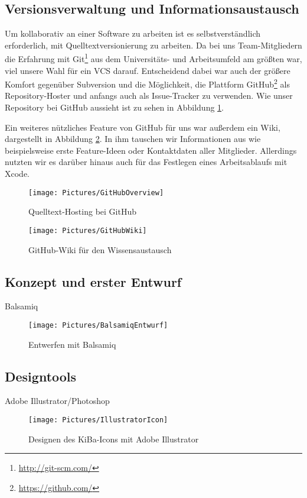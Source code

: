 \subsection{Versionsverwaltung und Informationsaustausch}
	Um kollaborativ an einer Software zu arbeiten ist es selbstverständlich erforderlich, mit Quelltextversionierung zu arbeiten. Da bei uns Team-Mitgliedern die Erfahrung mit Git\footnote{\url{http://git-scm.com/}} aus dem Universitäts- und Arbeitsumfeld am größten war, viel unsere Wahl für ein \acs{VCS} darauf. Entscheidend dabei war auch der größere Komfort gegenüber Subversion und die Möglichkeit, die Plattform GitHub\footnote{\url{https://github.com/}} als Repository-Hoster und anfangs auch als Issue-Tracker zu verwenden. Wie unser Repository bei GitHub aussieht ist zu sehen in Abbildung \ref{fig:GitHubOverview}.
	
	Ein weiteres nützliches Feature von GitHub für uns war außerdem ein Wiki, dargestellt in Abbildung \ref{fig:GitHubWiki}. In ihm tauschen wir Informationen aus wie beispielsweise erste Feature-Ideen oder Kontaktdaten aller Mitglieder. Allerdings nutzten wir es darüber hinaus auch für das Festlegen eines Arbeitsablaufs mit Xcode.
	
\begin{figure}
	\centering
	\texttt{[image: Pictures/GitHubOverview]}
	\caption{Quelltext-Hosting bei GitHub \label{fig:GitHubOverview}}
\end{figure}

\begin{figure}
	\centering
	\texttt{[image: Pictures/GitHubWiki]}
	\caption{GitHub-Wiki für den Wissensaustausch \label{fig:GitHubWiki}}
\end{figure}

\subsection{Konzept und erster Entwurf}
Balsamiq
\begin{figure}
	\centering
	\texttt{[image: Pictures/BalsamiqEntwurf]}
	\label{fig:BalsamiqEntwurf}
	\caption{Entwerfen mit Balsamiq}
\end{figure}

\subsection{Designtools}
Adobe Illustrator/Photoshop
\begin{figure}
	\centering
	\texttt{[image: Pictures/IllustratorIcon]}
	\label{fig:IllustratorIcon}
	\caption{Designen des KiBa-Icons mit Adobe Illustrator}
\end{figure}
